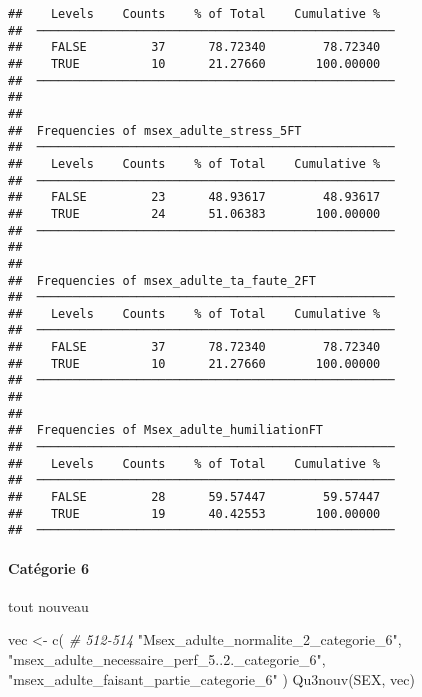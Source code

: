 \documentclass[
]{article}
\newenvironment{Shaded}{\begin{snugshade}}{\end{snugshade}}
\newcommand{\CommentTok}[1]{\textcolor[rgb]{0.56,0.35,0.01}{\textit{#1}}}
\newcommand{\FunctionTok}[1]{\textcolor[rgb]{0.00,0.00,0.00}{#1}}
\newcommand{\NormalTok}[1]{#1}
\newcommand{\OtherTok}[1]{\textcolor[rgb]{0.56,0.35,0.01}{#1}}
\newcommand{\StringTok}[1]{\textcolor[rgb]{0.31,0.60,0.02}{#1}}
\begin{document}
\begin{verbatim}
##    Levels    Counts    % of Total    Cumulative %   
##  ────────────────────────────────────────────────── 
##    FALSE         37      78.72340        78.72340   
##    TRUE          10      21.27660       100.00000   
##  ────────────────────────────────────────────────── 
## 
## 
##  Frequencies of msex_adulte_stress_5FT              
##  ────────────────────────────────────────────────── 
##    Levels    Counts    % of Total    Cumulative %   
##  ────────────────────────────────────────────────── 
##    FALSE         23      48.93617        48.93617   
##    TRUE          24      51.06383       100.00000   
##  ────────────────────────────────────────────────── 
## 
## 
##  Frequencies of msex_adulte_ta_faute_2FT            
##  ────────────────────────────────────────────────── 
##    Levels    Counts    % of Total    Cumulative %   
##  ────────────────────────────────────────────────── 
##    FALSE         37      78.72340        78.72340   
##    TRUE          10      21.27660       100.00000   
##  ────────────────────────────────────────────────── 
## 
## 
##  Frequencies of Msex_adulte_humiliationFT           
##  ────────────────────────────────────────────────── 
##    Levels    Counts    % of Total    Cumulative %   
##  ────────────────────────────────────────────────── 
##    FALSE         28      59.57447        59.57447   
##    TRUE          19      40.42553       100.00000   
##  ──────────────────────────────────────────────────
\end{verbatim}

\hypertarget{catuxe9gorie-6-1}{%
\paragraph{Catégorie 6}\label{catuxe9gorie-6-1}}

tout nouveau

\begin{Shaded}
\begin{Highlighting}[]
\NormalTok{vec }\OtherTok{\textless{}{-}} \FunctionTok{c}\NormalTok{(   }\CommentTok{\# 512{-}514}
   \StringTok{"Msex\_adulte\_normalite\_2\_categorie\_6"}\NormalTok{,}
   \StringTok{"msex\_adulte\_necessaire\_perf\_5..2.\_categorie\_6"}\NormalTok{,}
   \StringTok{"msex\_adulte\_faisant\_partie\_categorie\_6"}
\NormalTok{)}
\FunctionTok{Qu3nouv}\NormalTok{(SEX, vec)}
\end{Highlighting}
\end{Shaded}
\end{document}
